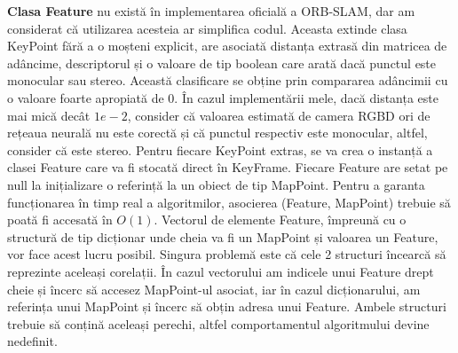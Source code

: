 \documentclass[12pt,a4paper]{report}
\begin{document}
\textbf{Clasa Feature} nu există în implementarea oficială a ORB-SLAM, dar am considerat 
că utilizarea acesteia ar simplifica codul. Aceasta extinde clasa KeyPoint fără a o moșteni explicit,
are asociată distanța extrasă din matricea de adâncime, descriptorul
și o valoare de tip boolean care arată dacă punctul este monocular sau stereo. Această clasificare
se obține prin compararea adâncimii cu o valoare foarte apropiată de 0. În cazul implementării mele,
dacă distanța este mai mică decât $ 1e-2 $, consider că valoarea estimată de camera RGBD ori de rețeaua
neurală nu este corectă și că punctul respectiv este monocular, altfel, consider că este stereo. Pentru
fiecare KeyPoint extras, se va crea o instanță a clasei Feature care va fi stocată direct în KeyFrame. 
Fiecare Feature are setat pe null la inițializare o referință la un obiect de tip MapPoint. Pentru a
garanta funcționarea în timp real a algoritmilor, asocierea (Feature, MapPoint) trebuie să poată fi accesată
în $ O(1) $. Vectorul de elemente Feature, împreună cu o structură de tip dicționar unde cheia va fi un MapPoint
și valoarea un Feature, vor face acest lucru posibil. Singura problemă este că cele 2 structuri încearcă să 
reprezinte aceleași corelații. În cazul vectorului am indicele unui Feature drept cheie și încerc
să accesez MapPoint-ul asociat, iar în cazul dicționarului, am referința unui MapPoint și încerc să
obțin adresa unui Feature. Ambele structuri trebuie să conțină aceleași perechi, altfel comportamentul 
algoritmului devine nedefinit. \\
\end{document}
